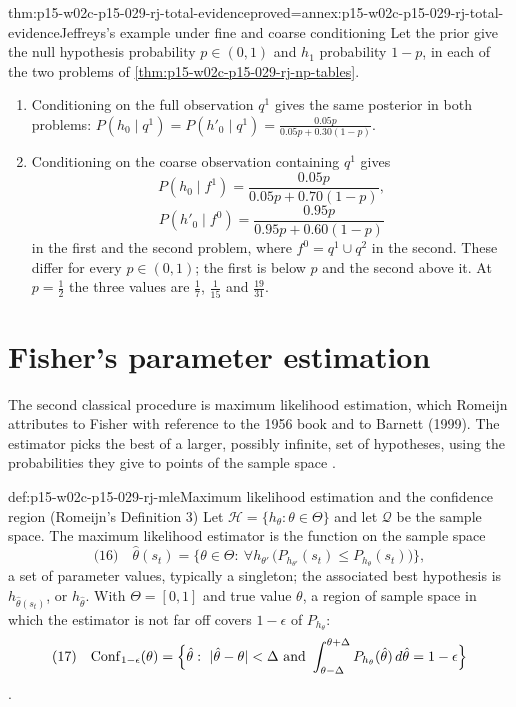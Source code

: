 \begin{hbtheorem}{thm:p15-w02c-p15-029-rj-total-evidence}{proved=annex:p15-w02c-p15-029-rj-total-evidence}{Jeffreys's example under fine and coarse conditioning}
Let the prior give the null hypothesis probability \(p\in(0,1)\) and
\(h_1\) probability \(1-p\), in each of the two problems of
\cref{thm:p15-w02c-p15-029-rj-np-tables}.
\begin{enumerate}
\item Conditioning on the full observation \(q^1\) gives the same
  posterior in both problems:
  \(P(h_0\mid q^1)=P(h'_0\mid q^1)=\frac{0.05p}{0.05p+0.30(1-p)}\).
\item Conditioning on the coarse observation containing \(q^1\) gives
  \[
   P(h_0\mid f^1)=\frac{0.05p}{0.05p+0.70(1-p)},
  \]
  \[
   P(h'_0\mid f^0)=\frac{0.95p}{0.95p+0.60(1-p)}
  \]
  in the first and the second problem, where \(f^0=q^1\cup q^2\) in the
  second. These differ for every \(p\in(0,1)\);
  the first is below \(p\) and the second above it. At \(p=\tfrac12\) the
  three values are \(\tfrac17\), \(\tfrac1{15}\) and \(\tfrac{19}{31}\).
\end{enumerate}
\end{hbtheorem}

\section{Fisher's parameter estimation}
\label{sec:p15-w02c-p15-029-rj-fisher}

The second classical procedure is maximum likelihood estimation, which
Romeijn attributes to Fisher with reference to the 1956 book and to
Barnett (1999). The estimator picks the best of a larger, possibly
infinite, set of hypotheses, using the probabilities they give to
points of the sample space \cite[p.~643]{Romeijn2011InductiveLogicStatistics}.

\begin{hbdefinition}{def:p15-w02c-p15-029-rj-mle}{Maximum likelihood estimation and the confidence region (Romeijn's Definition 3)}
Let \(\mathcal H=\{h_\theta:\theta\in\Theta\}\) and let \(\mathcal Q\)
be the sample space. The maximum likelihood estimator is the function
on the sample space
\[
 \text{(16)}\quad \hat\theta(s_t)=\{\theta\in\Theta:\ \forall h_{\theta'}\,\bigl(P_{h_{\theta'}}(s_t)\le P_{h_\theta}(s_t)\bigr)\},
\]
a set of parameter values, typically a singleton; the associated best
hypothesis is \(h_{\hat\theta(s_t)}\), or \(h_{\hat\theta}\). With
\(\Theta=[0,1]\) and true value \(\theta\), a region of sample space in
which the estimator is not far off covers \(1-\epsilon\) of
\(P_{h_\theta}\):
\[
 \text{(17)}\quad \mathrm{Conf}_{1-\epsilon}(\theta)=\Bigl\{\hat\theta:\ |\hat\theta-\theta|<\Delta\ \text{and}\ \int_{\theta-\Delta}^{\theta+\Delta}P_{h_\theta}(\hat\theta)\,d\hat\theta=1-\epsilon\Bigr\}
\]
\cite[p.~643]{Romeijn2011InductiveLogicStatistics}.
\end{hbdefinition}

